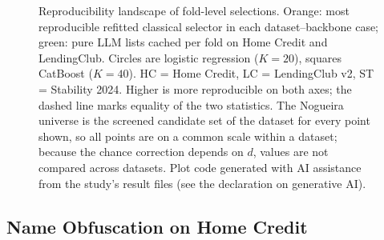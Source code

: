 \documentclass[final,5p,twocolumn]{elsarticle}
\newcommand{\Kfeat}{K}
\begin{document}
\begin{figure}[htbp]
\begin{tikzpicture}
\end{tikzpicture}
\caption{Reproducibility landscape of fold-level selections. Orange: most reproducible refitted classical selector in each dataset--backbone case; green: pure LLM lists cached per fold on Home Credit and LendingClub. Circles are logistic regression ($\Kfeat=20$), squares CatBoost ($\Kfeat=40$). HC = Home Credit, LC = LendingClub v2, ST = Stability 2024. Higher is more reproducible on both axes; the dashed line marks equality of the two statistics. The Nogueira universe is the screened candidate set of the dataset for every point shown, so all points are on a common scale within a dataset; because the chance correction depends on $d$, values are not compared across datasets. Plot code generated with AI assistance from the study's result files (see the declaration on generative AI).}
\label{fig:stability}
\end{figure}

\subsection{Name Obfuscation on Home Credit}
\label{subsec:obfuscation_results}
\end{document}
